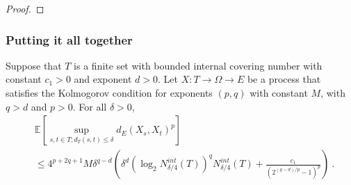 \begin{proof}

\end{proof}



\subsubsection{Putting it all together}

\begin{theorem}\label{thm:finite_set_bound_of_dist_le}
  \leanok
Suppose that $T$ is a finite set with bounded internal covering number with constant $c_1>0$ and exponent $d > 0$.
Let $X : T \to \Omega \to E$ be a process that satisfies the Kolmogorov condition for exponents $(p,q)$ with constant $M$, with $q > d$ and $p > 0$.
For all $\delta > 0$,
\begin{align*}
  &\mathbb{E}\left[ \sup_{s, t \in T; d_T(s, t) \le \delta} d_E(X_s, X_t)^p \right]
  \\
  &\le 4^{p+2q+1} M \delta^{q-d} \left(\delta^d \left(\log_2 N^{int}_{\delta/4}(T) \right)^q  N^{int}_{\delta/4}(T)
    + \frac{c_1}{\left( 2^{(q -d)/p} - 1\right)^p}\right)
  \: .
\end{align*}
\end{theorem}

